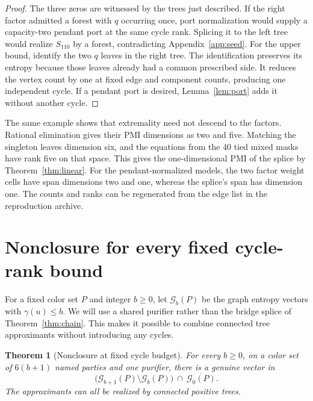 \documentclass[11pt]{article}
\newtheorem{theorem}{Theorem}[section]
\newcommand{\ray}{S_{110}}
\begin{document}
\begin{proof}
The three zeros are witnessed by the trees just described. If the
right factor admitted a forest with \(q\) occurring once, port
normalization would supply a capacity-two pendant port at the same
cycle rank. Splicing it to the left tree would realize \(\ray\) by a
forest, contradicting Appendix~\ref{app:seed}. For the upper bound,
identify the two \(q\) leaves in the right tree. The identification
preserves its entropy because those leaves already had a common
prescribed side. It reduces the vertex count by one at fixed edge
and component counts, producing one independent cycle. If a pendant
port is desired, Lemma~\ref{lem:port} adds it without another cycle.
\end{proof}

The same example shows that extremality need not descend to the
factors. Rational elimination gives their PMI dimensions as two and
five. Matching the singleton leaves dimension six, and the equations
from the 40 tied mixed masks have rank five on that space. This gives
the one-dimensional PMI of the splice by Theorem~\ref{thm:linear}.
For the pendant-normalized models, the two factor weight cells have
span dimensions two and one, whereas the splice's span has dimension
one. The counts and ranks can be regenerated from the edge list in the
reproduction archive.

\section{Nonclosure for every fixed cycle-rank bound}
\label{sec:limit}

For a fixed color set \(P\) and integer \(b\geq0\), let \(\mathcal G_b(P)\)
be the graph entropy vectors with \(\gamma(u)\leq b\). We will use a
shared purifier rather than the bridge splice of
Theorem~\ref{thm:chain}. This makes it possible to combine connected
tree approximants without introducing any cycles.

\begin{theorem}[Nonclosure at fixed cycle budget]
\label{thm:nonclosed}
For every \(b\geq0\), on a color set of \(6(b+1)\) named parties and one
purifier, there is a genuine vector in
\[
 \bigl(\mathcal G_{b+1}(P)\setminus\mathcal G_b(P)\bigr)
 \ \cap\ \overline{\mathcal G_0(P)}.
\]
The approximants can all be realized by connected positive trees.
\end{theorem}
\end{document}
